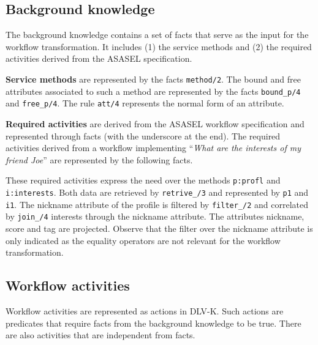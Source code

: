\subsection{Background knowledge} \label{subsec:kb}
The background knowledge contains a set of facts that serve as the input for the workflow transformation. It includes (1) the service methods and (2) the required activities derived from the ASASEL specification.
               
\textbf{Service methods} are represented by the facts \texttt{method/2}. The bound and free attributes associated to such a method are represented by the facts \texttt{bound_p/4} and \texttt{free_p/4}. The rule \texttt{att/4} represents the normal form of an attribute.

%


\vspace*{0.25cm}
\textbf{Required activities} are derived from the ASASEL workflow specification and represented through facts (with the underscore at the end). The required activities derived from a workflow implementing ``\textit{What are the interests of my friend Joe}'' are represented by the following facts. 

%


\vspace*{0.25cm}
These required activities express the need over the methods \texttt{p:profl} and \texttt{i:interests}. Both data are retrieved by \texttt{retrive\_/3} and represented by \texttt{p1} and \texttt{i1}. The nickname attribute of the profile is filtered by \texttt{filter\_/2} and correlated by \texttt{join\_/4} interests through the nickname attribute. The attributes nickname, score and tag are projected. Observe that the filter over the nickname attribute is only indicated as the equality operators are not relevant for the workflow transformation.

\subsection{Workflow activities}
Workflow activities are represented as actions in DLV-K. Such actions are predicates that require facts from the background knowledge to be true. There are also activities that are independent from facts.
         
